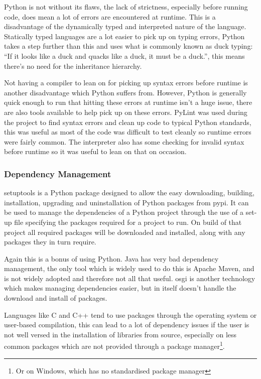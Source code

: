 Python is not without its flaws, the lack of strictness, especially before running code, does mean
a lot of errors are encountered at runtime. This is a disadvantage of the dynamically typed and
interpreted nature of the language. Statically typed languages are a lot easier to pick up on
typing errors, Python takes a step further than this and uses what is commonly known as duck
typing: ``If it looks like a duck and quacks like a duck, it must be a duck.''\cite{2013Glossary},
this means there's no need for the inheritance hierarchy. 

Not having a compiler to lean on for picking up syntax errors before runtime is another
disadvantage which Python suffers from. However, Python is generally quick enough to run that 
hitting these errors at runtime isn't a huge issue, there are also tools available to help pick up
on these errors. PyLint was used during the project to find syntax errors and clean up code to
typical Python standards, this was useful as most of the code was difficult to test cleanly so
runtime errors were fairly common. The interpreter also has some checking for invalid syntax 
before runtime so it was useful to lean on that on occasion.


\subsubsection{Dependency Management}
setuptools is a Python package designed to allow the easy downloading, building, 
installation, upgrading and uninstallation of Python packages from \gls{pypi}. It can be used to
manage the dependencies of a Python project through the use of a set-up file specifying the 
packages required for a project to run. On build of that project all required packages will be 
downloaded and installed, along with any packages they in turn require.

Again this is a bonus of using Python. Java has very bad dependency management, the only tool
which is widely used to do this is Apache Maven, and is not widely adopted and therefore not all
that useful. \Gls{osgi} is another technology which makes managing dependencies easier, but in 
itself doesn't handle the download and install of packages.

Languages like C and C++ tend to use packages through the operating system or user-based 
compilation, this can lead to a lot of dependency issues if the user is not well versed in the
installation of libraries from source, especially on less common packages which are not provided
through a package manager\footnote{Or on Windows, which has no standardised package manager}.

